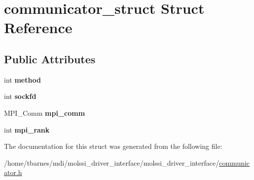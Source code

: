 \hypertarget{structcommunicator__struct}{\section{communicator\-\_\-struct Struct Reference}
\label{structcommunicator__struct}
}
\subsection*{Public Attributes}
\begin{DoxyCompactItemize}
\item 
\hypertarget{structcommunicator__struct_ae15048c78f1d9c895ccf9563519c24fe}{int {\bfseries method}}\label{structcommunicator__struct_ae15048c78f1d9c895ccf9563519c24fe}

\item 
\hypertarget{structcommunicator__struct_a9f010a22911cb8a55767c054b0596030}{int {\bfseries sockfd}}\label{structcommunicator__struct_a9f010a22911cb8a55767c054b0596030}

\item 
\hypertarget{structcommunicator__struct_a2a65c13dff3a01c383f0bd306cc9fb4b}{M\-P\-I\-\_\-\-Comm {\bfseries mpi\-\_\-comm}}\label{structcommunicator__struct_a2a65c13dff3a01c383f0bd306cc9fb4b}

\item 
\hypertarget{structcommunicator__struct_a72d04b0314ebff74daf08cfc97a7f8ff}{int {\bfseries mpi\-\_\-rank}}\label{structcommunicator__struct_a72d04b0314ebff74daf08cfc97a7f8ff}

\end{DoxyCompactItemize}


The documentation for this struct was generated from the following file\-:\begin{DoxyCompactItemize}
\item 
/home/tbarnes/mdi/molssi\-\_\-driver\-\_\-interface/molssi\-\_\-driver\-\_\-interface/\hyperlink{communicator_8h}{communicator.\-h}\end{DoxyCompactItemize}
